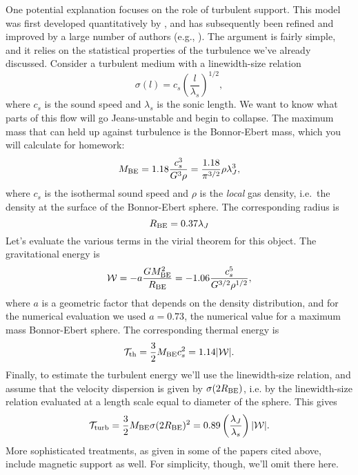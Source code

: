 One potential explanation focuses on the role of turbulent support. This model was first developed quantitatively by \citet{krumholz05c}, and has subsequently been refined and improved by a large number of authors (e.g., \citealt{hennebelle11b, padoan11a, padoan14a, federrath12a}). The argument is fairly simple, and it relies on the statistical properties of the turbulence we've already discussed. Consider a turbulent medium with a linewidth-size relation
\begin{equation}
\sigma(l)=c_s\left(\frac{l}{\lambda_s}\right)^{1/2},
\end{equation}
where $c_s$ is the sound speed and $\lambda_s$ is the sonic length. We want to know what parts of this flow will go Jeans-unstable and begin to collapse. The maximum mass that can held up against turbulence is the Bonnor-Ebert mass, which you will calculate for homework:
\begin{equation}
M_{\rm BE} = 1.18 \frac{c_s^3}{G^3\rho} = \frac{1.18}{\pi^{3/2}}\rho \lambda_J^3,
\end{equation}
where $c_s$ is the isothermal sound speed and $\rho$ is the {\it local} gas density, i.e.\ the density at the surface of the Bonnor-Ebert sphere. The corresponding radius is
\begin{equation}
R_{\rm BE} = 0.37\lambda_J
\end{equation}
Let's evaluate the various terms in the virial theorem for this object. The gravitational energy is
\begin{equation}
\mathcal{W} = -a \frac{G M_{\rm BE}^2}{R_{\rm BE}} = -1.06 \frac{c_s^5}{G^{3/2} \rho^{1/2}},
\end{equation}
where $a$ is a geometric factor that depends on the density distribution, and for the numerical evaluation we used $a=0.73$, the numerical value for a maximum mass Bonnor-Ebert sphere. The corresponding thermal energy is
\begin{equation}
\mathcal{T}_{\rm th} = \frac{3}{2}M_{\rm BE} c_s^2 = 1.14 |\mathcal{W}|.
\end{equation}
Finally, to estimate the turbulent energy we'll use the linewidth-size relation, and assume that the velocity dispersion is given by $\sigma(2 R_{\rm BE})$, i.e. by the linewidth-size relation evaluated at a length scale equal to diameter of the sphere. This gives
\begin{equation}
\mathcal{T}_{\rm turb} = \frac{3}{2} M_{\rm BE} \sigma(2R_{\rm BE})^2 = 0.89 \left(\frac{\lambda_J}{\lambda_s}\right) |\mathcal{W}|.
\end{equation}
More sophisticated treatments, as given in some of the papers cited above, include magnetic support as well. For simplicity, though, we'll omit there here.

